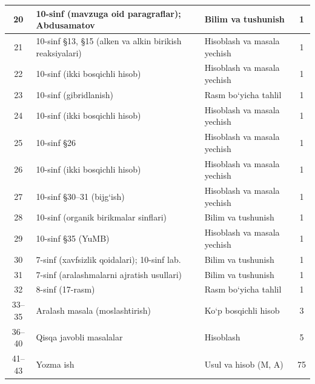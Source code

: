 \documentclass[11pt,a4paper]{article}
\begin{document}
{\begin{longtable}{|c|p{7.2cm}|p{5.4cm}|c|}
20 & 10-sinf (mavzuga oid paragraflar); Abdusamatov & Bilim va tushunish & 1\\\hline
21 & 10-sinf \S{}13, \S{}15 (alken va alkin birikish reaksiyalari) & Hisoblash va masala yechish & 1\\\hline
22 & 10-sinf (ikki bosqichli hisob) & Hisoblash va masala yechish & 1\\\hline
23 & 10-sinf (gibridlanish) & Rasm bo`yicha tahlil & 1\\\hline
24 & 10-sinf (ikki bosqichli hisob) & Hisoblash va masala yechish & 1\\\hline
25 & 10-sinf \S{}26 & Hisoblash va masala yechish & 1\\\hline
26 & 10-sinf (ikki bosqichli hisob) & Hisoblash va masala yechish & 1\\\hline
27 & 10-sinf \S{}30--31 (bijg`ish) & Hisoblash va masala yechish & 1\\\hline
28 & 10-sinf (organik birikmalar sinflari) & Bilim va tushunish & 1\\\hline
29 & 10-sinf \S{}35 (YuMB) & Hisoblash va masala yechish & 1\\\hline
30 & 7-sinf (xavfsizlik qoidalari); 10-sinf lab. & Bilim va tushunish & 1\\\hline
31 & 7-sinf (aralashmalarni ajratish usullari) & Bilim va tushunish & 1\\\hline
32 & 8-sinf (17-rasm) & Rasm bo`yicha tahlil & 1\\\hline
33--35 & Aralash masala (moslashtirish) & Ko`p bosqichli hisob & 3\\\hline
36--40 & Qisqa javobli masalalar & Hisoblash & 5\\\hline
41--43 & Yozma ish & Usul va hisob (M, A) & 75\\\hline
\end{longtable}}
\end{document}
